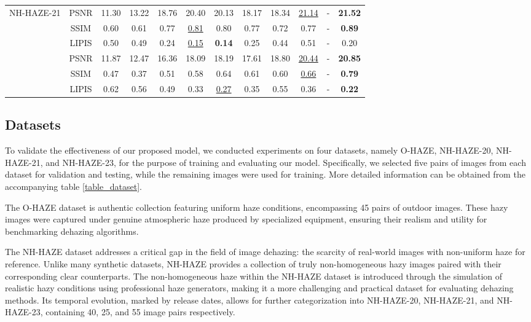 \documentclass[lettersize,journal]{IEEEtran}
\begin{document}
\begin{table}
\begin{center}
{\begin{tabular}{ c | c | c | c | c | c | c | c | c | c | c | c }
				\multirow{4}{*}{NH-HAZE-21} & PSNR & 11.30 & 13.22 & 18.76 & 20.40 & 20.13 & 18.17 & 18.34 & \underline{21.14} & - & \textbf{21.52} \\
				& SSIM & 0.60 & 0.61 & 0.77 & \underline{0.81} & 0.80 & 0.77 & 0.72 & 0.77 & - & \textbf{0.89} \\
				& LIPIS & 0.50 & 0.49 & 0.24 & \underline{0.15} & \textbf{0.14} & 0.25 & 0.44 & 0.51 & - & 0.20 \\
				\hline
				
				\multirow{4}{*}{NH-HAZE-23} & PSNR & 11.87 & 12.47 & 16.36 & 18.09 & 18.19 & 17.61 & 18.80 & \underline{20.44} & - & \textbf{20.85} \\
				& SSIM & 0.47 & 0.37 & 0.51 & 0.58 & 0.64 & 0.61 & 0.60 & \underline{0.66} & - & \textbf{0.79} \\
				& LIPIS & 0.62 & 0.56 & 0.49 & 0.33 & \underline{0.27} & 0.35 & 0.55 & 0.36 & - & \textbf{0.22} \\
				\hline			
			\end{tabular}
		}
		
	\end{center}
\end{table}

\subsection{Datasets}
To validate the effectiveness of our proposed model, we conducted experiments on four datasets, namely O-HAZE\cite{ancuti2018ohaze}, NH-HAZE-20\cite{ancuti2020ntire}, NH-HAZE-21\cite{ancuti2021ntire}, and NH-HAZE-23\cite{ancuti2023ntire}, for the purpose of training and evaluating our model. Specifically, we selected five pairs of images from each dataset for validation and testing, while the remaining images were used for training. More detailed information can be obtained from the accompanying table \ref{table_dataset}.

The O-HAZE dataset is authentic collection featuring uniform haze conditions, encompassing 45 pairs of outdoor images. These hazy images were captured under genuine atmospheric haze produced by specialized equipment, ensuring their realism and utility for benchmarking dehazing algorithms.

The NH-HAZE dataset addresses a critical gap in the field of image dehazing: the scarcity of real-world images with non-uniform haze for reference. Unlike many synthetic datasets, NH-HAZE provides a collection of truly non-homogeneous hazy images paired with their corresponding clear counterparts. The non-homogeneous haze within the NH-HAZE dataset is introduced through the simulation of realistic hazy conditions using professional haze generators, making it a more challenging and practical dataset for evaluating dehazing methods. Its temporal evolution, marked by release dates, allows for further categorization into NH-HAZE-20, NH-HAZE-21, and NH-HAZE-23, containing 40, 25, and 55 image pairs respectively.
\end{document}
